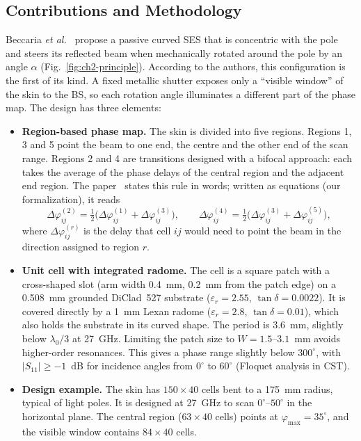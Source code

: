 \subsection{Contributions and Methodology}
Beccaria \textit{et al.}~\cite{Beccaria2025B} propose a passive curved SES that is concentric with the pole and steers its reflected beam when mechanically rotated around the pole by an angle $\alpha$ (Fig.~\ref{fig:ch2-principle}). According to the authors, this configuration is the first of its kind. A fixed metallic shutter exposes only a ``visible window'' of the skin to the BS, so each rotation angle illuminates a different part of the phase map. The design has three elements:
\begin{itemize}
    \item \textbf{Region-based phase map.} The skin is divided into five regions. Regions 1, 3 and 5 point the beam to one end, the centre and the other end of the scan range. Regions 2 and 4 are transitions designed with a bifocal approach: each takes the average of the phase delays of the central region and the adjacent end region. The paper~\cite{Beccaria2025B} states this rule in words; written as equations (our formalization), it reads
    \begin{equation}\label{eq:ch2-transition}
    \Delta\varphi^{(2)}_{ij} = \tfrac{1}{2}\bigl(\Delta\varphi^{(1)}_{ij} + \Delta\varphi^{(3)}_{ij}\bigr), \qquad
    \Delta\varphi^{(4)}_{ij} = \tfrac{1}{2}\bigl(\Delta\varphi^{(3)}_{ij} + \Delta\varphi^{(5)}_{ij}\bigr),
    \end{equation}
    where $\Delta\varphi^{(r)}_{ij}$ is the delay that cell $ij$ would need to point the beam in the direction assigned to region $r$.
    \item \textbf{Unit cell with integrated radome.} The cell is a square patch with a cross-shaped slot (arm width 0.4~mm, 0.2~mm from the patch edge) on a 0.508~mm grounded DiClad~527 substrate ($\varepsilon_r = 2.55$, $\tan\delta = 0.0022$). It is covered directly by a 1~mm Lexan radome ($\varepsilon_r = 2.8$, $\tan\delta = 0.01$), which also holds the substrate in its curved shape. The period is 3.6~mm, slightly below $\lambda_0/3$ at 27~GHz. Limiting the patch size to $W = 1.5$--$3.1$~mm avoids higher-order resonances. This gives a phase range slightly below $300^\circ$, with $|S_{11}| \geq -1$~dB for incidence angles from $0^\circ$ to $60^\circ$ (Floquet analysis in CST).
    \item \textbf{Design example.} The skin has $150 \times 40$ cells bent to a 175~mm radius, typical of light poles. It is designed at 27~GHz to scan $0^\circ$--$50^\circ$ in the horizontal plane. The central region ($63 \times 40$ cells) points at $\varphi_{\max} = 35^\circ$, and the visible window contains $84 \times 40$ cells.
\end{itemize}
